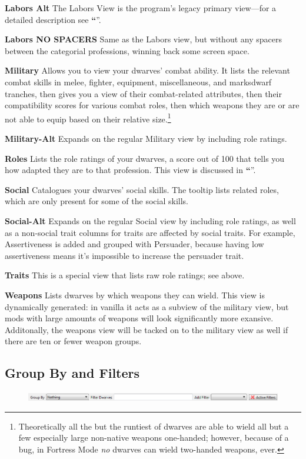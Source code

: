 \documentclass[]{article}
\newcommand{\jump}[1] {\textbf{``\nameref{sec:#1}}''}
\newcommand{\boldlist}[1] {
\vspace{12pt}
\noindent \textbf{#1}
}
\begin{document}
\boldlist{Labors Alt} The Labors View is the program's legacy primary view---for a detailed
description see \jump{Labors View}.


\boldlist{Labors NO SPACERS} Same as the Labors view, but without any spacers between the
categorial professions, winning back some screen space.


\boldlist{Military} Allows you to view your dwarves' combat ability. It lists the relevant combat
skills in melee, fighter, equipment, miscellaneous, and marksdwarf tranches, then gives you a view of
their combat-related attributes,  then their compatibility scores for various combat roles, then which
weapons they are or are not able to equip based on their relative size.\footnote{Theoretically all the
but the runtiest of dwarves are able to wield all but a few especially large non-native weapons
one-handed; however, because of a bug, in Fortress Mode \emph{no} dwarves can wield two-handed weapons,
ever.}


\boldlist{Military-Alt} Expands on the regular Military view by including role ratings.


\boldlist{Roles} Lists the role ratings of your dwarves, a score out of 100 that tells you how
adapted they are to that profession. This view is discussed in \jump{Using Roles---The View Method}.


\boldlist{Social} Catalogues your dwarves' social skills. The tooltip lists related
roles, which are only present for some of the social skills.


\boldlist{Social-Alt} Expands on the regular Social view by including role ratings, as well as a
non-social trait columns for traits are affected by social traits. For example, Assertiveness is added
and grouped with Persuader, because having low assertiveness means it's impossible to increase the
persuader trait.


\boldlist{Traits} This is a special view that lists raw role ratings; see above.


\boldlist{Weapons} Lists dwarves by which weapons they can wield. This view is
dynamically generated: in vanilla it acts as a subview of the military view, but mods with large amounts
of weapons will look significantly more exansive. Additonally, the weapons view will be tacked on to the
military view as well if there are ten or fewer weapon groups.

\subsection{Group By and Filters}
\label{sec:Group By and Filters}
\begin{figure}[h!]
\centering
\includegraphics[width=\linewidth]{Sec1Fig11}
\end{figure}
\end{document}
